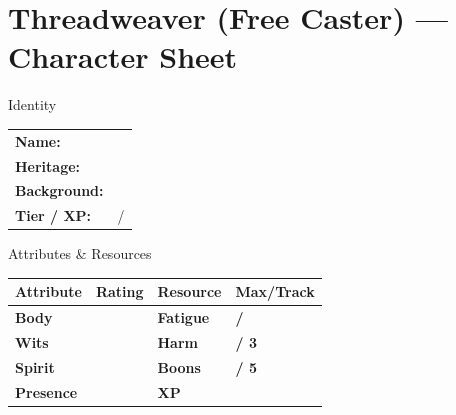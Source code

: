 \documentclass[10pt]{article}
\begin{document}
\newpage

\section*{Threadweaver (Free Caster) --- Character Sheet}

\begin{minipage}[t]{0.48\linewidth}
    \begin{charbox}{Identity}
        \begin{tabular}{p{2.5cm} p{5cm}}
            \textbf{Name:} & \underline{\hspace{4cm}} \\
            \textbf{Heritage:} & \underline{\hspace{4cm}} \\
            \textbf{Background:} & \underline{\hspace{4cm}} \\
            \textbf{Tier / XP:} & \underline{\hspace{2cm}} / \underline{\hspace{2cm}} \\
        \end{tabular}
    \end{charbox}
    
    \vspace{0.5em}
    
    \begin{charbox}{Attributes \& Resources}
        \begin{tabular}{>{\bfseries}p{2.5cm} >{\bfseries}p{1.5cm} >{\bfseries}p{2.5cm} >{\bfseries}p{1.5cm}}
            \toprule
            \textbf{Attribute} & \textbf{Rating} & \textbf{Resource} & \textbf{Max/Track} \\
            \midrule
            Body & \underline{\hspace{1.5cm}} & Fatigue & \underline{\hspace{1.5cm}} / \underline{\hspace{1.5cm}} \\
            Wits & \underline{\hspace{1.5cm}} & Harm & \underline{\hspace{1.5cm}} / 3 \\
            Spirit & \underline{\hspace{1.5cm}} & Boons & \underline{\hspace{1.5cm}} / 5 \\
            Presence & \underline{\hspace{1.5cm}} & XP & \underline{\hspace{1.5cm}} \\
            \bottomrule
        \end{tabular}
    \end{charbox}
    

\end{minipage}
\end{document}
